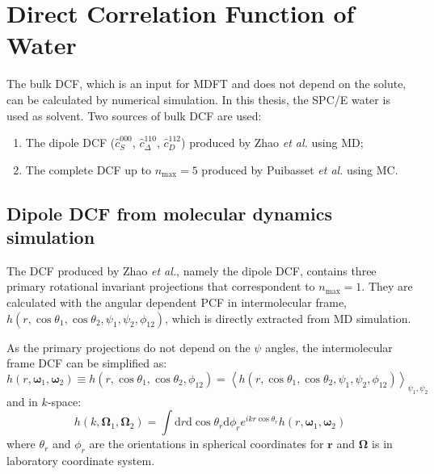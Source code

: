 
\chapter{Direct Correlation Function of Water\label{chpt:dcf-water}}

The bulk \acs{DCF}, which is an input for \acs{MDFT} and does not
depend on the solute, can be calculated by numerical simulation. In
this thesis, the SPC/E water is used as solvent. Two sources of bulk
\acs{DCF} are used: 
\begin{enumerate}
\item The dipole \acs{DCF} ($\hat{c}_{S}^{000}$, $\hat{c}_{\Delta}^{110}$,
$\hat{c}_{D}^{112}$) produced by Zhao \textit{et al.} \citep{zhao_accurate_2013}
using \acs{MD};
\item The complete \acs{DCF} up to $n_{\max}=5$ produced by Puibasset
\textit{et al.} \citep{puibasset_bridge_2012} using \acs{MC}.
\end{enumerate}

\section{Dipole DCF from molecular dynamics simulation}

The \acs{DCF} produced by Zhao \textit{et al.}, namely the dipole
\acs{DCF}, contains three primary rotational invariant projections
that correspondent to $n_{\max}=1$. They are calculated with the
angular dependent \acs{PCF} in intermolecular frame, $h(r,\cos\theta_{1},\cos\theta_{2},\psi_{1},\psi_{2},\phi_{12})$,
which is directly extracted from \acs{MD} simulation. 

As the primary projections do not depend on the $\psi$ angles, the
intermolecular frame \acs{DCF} can be simplified as:
\begin{equation}
h(r,\boldsymbol{\omega}_{1},\boldsymbol{\omega}_{2})\equiv h(r,\cos\theta_{1},\cos\theta_{2},\phi_{12})=\left\langle h(r,\cos\theta_{1},\cos\theta_{2},\psi_{1},\psi_{2},\phi_{12})\right\rangle _{\psi_{1},\psi_{2}}\label{eq:h-linear}
\end{equation}
and in $k$-space:
\begin{equation}
h(k,\mathbf{\Omega}_{1},\mathbf{\Omega}_{2})=\int\mathrm{d}r\mathrm{d}\cos\theta_{r}\mathrm{d}\phi_{r}e^{ikr\cos\theta_{r}}h(r,\boldsymbol{\omega}_{1},\boldsymbol{\omega}_{2})
\end{equation}
where $\theta_{r}$ and $\phi_{r}$ are the orientations in spherical
coordinates for $\mathbf{r}$ and $\mathbf{\Omega}$ is in laboratory
coordinate system.

